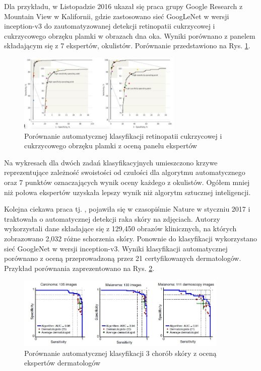  Dla przykładu, w Listopadzie 2016 ukazał się praca \cite{Gulshan2016} grupy Google Research z Mountain View w Kalifornii, gdzie zastosowano sieć GoogLeNet w wersji inception-v3 do zautomatyzowanej detekcji retinopatii cukrzycowej i cukrzycowego obrzęku plamki w obrazach dna oka. Wyniki porównano z panelem składającym się z 7 ekspertów, okulistów. Porównanie przedstawiono na Rys. \ref{CAD_opto}.
 \begin{figure}[h!]
 	\centering
 	\includegraphics[width=0.7\textwidth]{figures/CAD-okulisci.jpg}
 	\caption{Porównanie automatycznej klasyfikacji retinopatii cukrzycowej i cukrzycowego obrzęku plamki z oceną panelu ekspertów}
 	\label{CAD_opto}
 \end{figure}
 
 Na wykresach dla dwóch zadań klasyfikacyjnych umieszczono krzywe reprezentujące zależność swoistości od czułości dla algorytmu automatycznego oraz 7 punktów oznaczających wynik oceny każdego z okulistów. Ogółem mniej niż połowa ekspertów uzyskała lepszy wynik niż algorytm sztucznej inteligencji.
 
 Kolejna ciekawa praca tj. \cite{Esteva2017}, pojawiła się w czasopiśmie Nature w styczniu 2017 i traktowała o automatycznej detekcji raka skóry na zdjęciach. Autorzy wykorzystali dane składające się z 129,450 obrazów klinicznych, na których zobrazowano 2,032 różne schorzenia skóry. Ponownie do klasyfikacji wykorzystano sieć GoogleNet w wersji inception-v3. Wyniki klasyfikacji automatycznej porównano z oceną przeprowadzoną przez 21 certyfikowanych dermatologów. Przykład porównania zaprezentowano na Rys. \ref{CAD_derma}. 
 
 \begin{figure}[h!]
 	\centering
 	\includegraphics[width=0.9\textwidth]{figures/CAD-dermatolodzy.jpg}
 	\caption{Porównanie automatycznej klasyfikacji 3 chorób skóry z oceną ekspertów dermatologów}
 	\label{CAD_derma}
 \end{figure}

